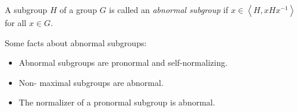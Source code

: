 \documentclass[12pt]{article}
\def\genby#1{{\left\langle #1\right\rangle}}
\begin{document}
A subgroup $H$ of a group $G$ is called an \emph{abnormal subgroup}
if $x\in\genby{H,xHx^{-1}}$ for all $x\in G$.

Some facts about abnormal subgroups:
\begin{itemize}
\item Abnormal subgroups are pronormal and self-normalizing.
\item Non- maximal subgroups are abnormal.
\item The normalizer of a pronormal subgroup is abnormal.
\end{itemize}

\end{document}
